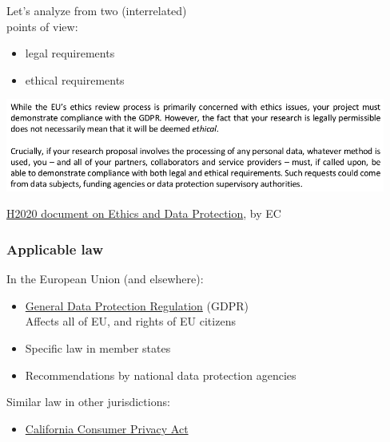 \documentclass[17pt,aspectratio=169,hyperref={pdfusetitle,colorlinks,allcolors=olive}]{beamer}
\begin{document}
\begin{frame}[fragile]

  Let's analyze from two (interrelated) \\ points of view: \\

  \vspace{1cm}

  {\large
  \begin{itemize}
  \item legal requirements
  \item ethical requirements
  \end{itemize}
  }
  
\end{frame}

\begin{frame}[fragile]
  \begin{center}
    \includegraphics[width=12.5cm]{figs/legal-ethical}
  \end{center}
  {\footnotesize
    \begin{flushright}
    \href{https://ec.europa.eu/research/participants/data/ref/h2020/grants_manual/hi/ethics/h2020_hi_ethics-data-protection_en.pdf}{H2020 document on Ethics and Data Protection},  by EC
    \end{flushright}
  }
\end{frame}

\begin{frame}[fragile]
  \frametitle{Applicable law}

  In the European Union (and elsewhere):
  
  \begin{itemize}
  \item \href{https://gdpr.eu/}{General Data Protection Regulation} (GDPR) \\
    Affects all of EU, and rights of EU citizens
  \item Specific law in member states
  \item Recommendations by national data protection agencies \\
  \end{itemize}

  Similar law in other jurisdictions:

  \begin{itemize}
  \item \href{https://www.oag.ca.gov/privacy/ccpa}{California Consumer Privacy Act}
  \end{itemize}
\end{frame}
\end{document}
